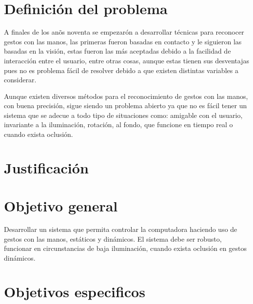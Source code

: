 \section{Definici\'on del problema}\label{sec:DefinicionProblema}

A finales de los an\~os noventa se empezar\'on a desarrollar t\'ecnicas para reconocer gestos con las manos, las primeras fueron basadas en contacto y le siguieron las basadas en la visión, estas fueron las m\'as aceptadas debido a la facilidad de interacción entre el usuario, entre otras cosas, aunque estas tienen sus desventajas pues no es problema fácil de resolver debido a que existen distintas variables a considerar.

Aunque existen diversos m\'etodos para el reconocimiento de gestos con las manos, con buena precisi\'on, sigue siendo un problema abierto ya que no es f\'acil tener un sistema que se adecue a todo tipo de situaciones como: amigable con el usuario, invariante a la iluminación, rotación, al fondo, que funcione en tiempo real o cuando exista oclusión.


\section{Justificaci\'on}\label{sec:Just}



\section{Objetivo general}\label{sec:ObjetivoGeneral}
 
Desarrollar un sistema que permita controlar la computadora haciendo uso de gestos con las manos, estáticos y dinámicos. El sistema debe ser robusto, funcionar en circunstancias de baja iluminación, cuando exista oclusión en gestos dinámicos.

\section{Objetivos especificos}\label{sec:objetivosEspecificos}

